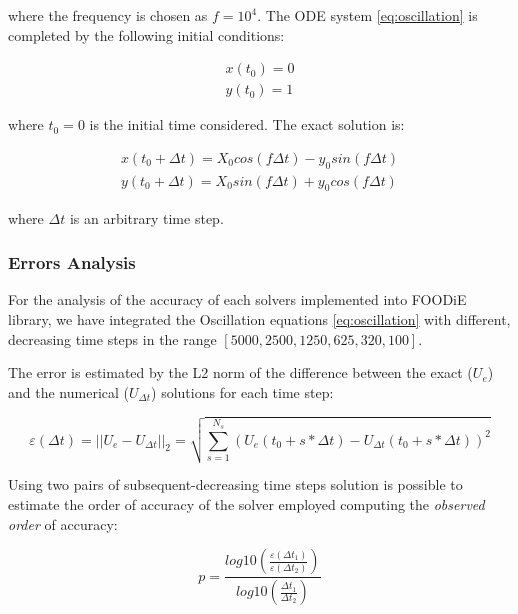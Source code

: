 \documentclass[pdftex,preprint,3p,times,numbers]{elsarticle}
\begin{document}
where the frequency is chosen as $f=10^4$. The ODE system \ref{eq:oscillation} is completed by the following initial conditions:

\begin{equation}
\begin{matrix}
  x(t_0) = 0 \\
  y(t_0) = 1
\end{matrix}
\label{eq:oscillation-ic}
\end{equation}

where $t_0=0$ is the initial time considered. The exact solution is:

\begin{equation}
\begin{matrix}
  x(t_0 + \Delta t) = X_0 cos(f \Delta t) - y_0 sin(f \Delta t) \\
  y(t_0 + \Delta t) = X_0 sin(f \Delta t) + y_0 cos(f \Delta t)
\end{matrix}
\label{eq:oscillation-exact}
\end{equation}

where $\Delta t$ is an arbitrary time step.

\subsubsection{Errors Analysis}

For the analysis of the accuracy of each solvers implemented into FOODiE library, we have integrated the Oscillation equations \ref{eq:oscillation} with different, decreasing time steps in the range $[5000, 2500, 1250, 625, 320, 100]$.

The error is estimated by the L2 norm of the difference between the exact ($U_e$) and the numerical ($U_{\Delta t}$) solutions for each time step:

\begin{equation}
  \varepsilon (\Delta t) = || U_e - U_{\Delta t} ||_2 = \sqrt{ \sum_{s=1}^{N_s} { \left(U_e(t_0 + s * \Delta t) - U_{\Delta t}(t_0 + s * \Delta t) \right)^2 }}
\label{eq:oscillation-error}
\end{equation}

Using two pairs of subsequent-decreasing time steps solution is possible to estimate the order of accuracy of the solver employed computing the \emph{observed order} of accuracy:

\begin{equation}
  p = \frac{log10 \left( \frac{\varepsilon (\Delta t_1)}{\varepsilon (\Delta t_2)} \right)}{log10 \left( \frac{\Delta t_1}{\Delta t_2} \right)}
\label{eq:oscillation-observed-order}
\end{equation}
\end{document}
